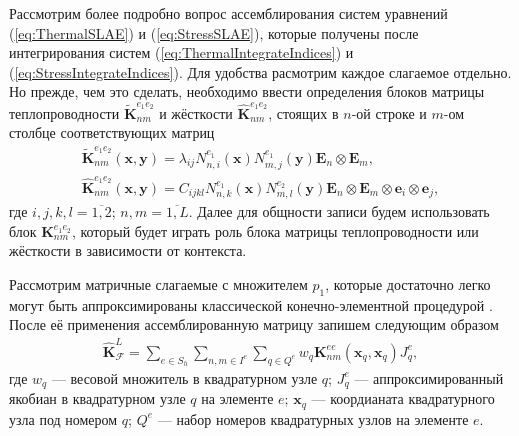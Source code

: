 Рассмотрим более подробно вопрос ассемблирования систем уравнений (\ref{eq:ThermalSLAE}) и (\ref{eq:StressSLAE}), которые получены после интегрирования систем (\ref{eq:ThermalIntegrateIndices}) и (\ref{eq:StressIntegrateIndices}). Для удобства расмотрим каждое слагаемое отдельно. Но прежде, чем это сделать, необходимо ввести определения блоков матрицы теплопроводности $\widetilde{\textbf{K}}_{nm}^{e_1 e_2}$ и жёсткости $\widehat{\textbf{K}}_{nm}^{e_1 e_2}$, стоящих в $n$-ой строке и $m$-ом столбце соответствующих матриц
\begin{gather}
	\label{eq:ThermalBlock}
	\widetilde{\textbf{K}}_{nm}^{e_1 e_2} (\boldsymbol{x}, \boldsymbol{y}) =
	\lambda_{ij} N_{n,i}^{e_1} (\boldsymbol{x}) N_{m,j}^{e_1} (\boldsymbol{y})
	\boldsymbol{E}_n \otimes \boldsymbol{E}_m, \\
	\label{eq:StressBlock}
	\widehat{\textbf{K}}_{nm}^{e_1 e_2} (\boldsymbol{x}, \boldsymbol{y}) = 
	C_{ijkl} N_{n,k}^{e_1} (\boldsymbol{x}) N_{m,l}^{e_2} (\boldsymbol{y}) \boldsymbol{E}_n \otimes \boldsymbol{E}_m \otimes \boldsymbol{e}_i \otimes \boldsymbol{e}_j,
\end{gather}
где $i,j,k,l = \overline{1,2}$; $n,m = \overline{1,L}$. Далее для общности записи будем использовать блок $\textbf{K}_{nm}^{e_1 e_2}$, который будет играть роль блока матрицы теплопроводности или жёсткости в зависимости от контекста.

Рассмотрим матричные слагаемые с множителем $p_1$, которые достаточно легко могут быть аппроксимированы классической конечно-элементной процедурой \cite{Zienkiewicz, Bathe}. После её применения ассемблированную матрицу запишем следующим образом
\begin{gather}
	\label{eq:LocalMatrix}
	\widehat{\textbf{K}}^L_{\mathcal{F}} =
	\sum\limits_{e \in S_h}
	\sum\limits_{n,m \in I^e}
	\sum\limits_{q \in Q^e}
	w_q \textbf{K}^{ee}_{nm} (\boldsymbol{x}_q, \boldsymbol{x}_q) J_q^e,
\end{gather}
где $w_q$ --- весовой множитель в квадратурном узле $q$;
$J_q^e$ --- аппроксимированный якобиан в квадратурном узле $q$ на элементе $e$;
$\boldsymbol{x}_q$ --- коордианата квадратурного узла под номером $q$;
$Q^e$ --- набор номеров квадратурных узлов на элементе $e$.

